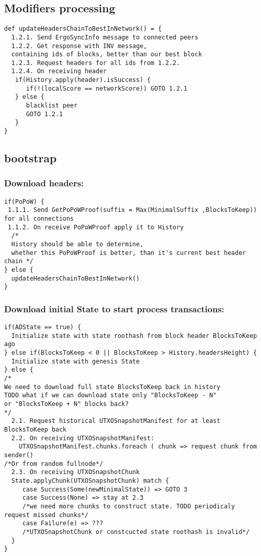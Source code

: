 \documentclass[]{report}   %
\begin{document}
\subsection{Modifiers processing}
\begin{verbatim}
def updateHeadersChainToBestInNetwork() = {
  1.2.1. Send ErgoSyncInfo message to connected peers
  1.2.2. Get response with INV message,
  containing ids of blocks, better than our best block
  1.2.3. Request headers for all ids from 1.2.2.
  1.2.4. On receiving header
   if(History.apply(header).isSuccess) {
      if(!(localScore == networkScore)) GOTO 1.2.1
   } else {
      blacklist peer
      GOTO 1.2.1
   }
}
\end{verbatim}

\subsection{bootstrap}
\subsubsection{Download headers:}
\begin{verbatim}
if(PoPoW) {
 1.1.1. Send GetPoPoWProof(suffix = Max(MinimalSuffix ,BlocksToKeep)) for all connections
 1.1.2. On receive PoPoWProof apply it to History
  /* 
  History should be able to determine, 
  whether this PoPoWProof is better, than it's current best header chain */
} else {
  updateHeadersChainToBestInNetwork()
}
\end{verbatim}
\subsubsection{Download initial State to start process transactions:}
\begin{verbatim}
if(ADState == true) {
  Initialize state with state roothash from block header BlocksToKeep ago
} else if(BlocksToKeep < 0 || BlocksToKeep > History.headersHeight) {
  Initialize state with genesis State
} else {
/*
We need to download full state BlocksToKeep back in history
TODO what if we can download state only "BlocksToKeep - N" 
or "BlocksToKeep + N" blocks back? 
*/
  2.1. Request historical UTXOSnapshotManifest for at least BlocksToKeep back
  2.2. On receiving UTXOSnapshotManifest: 
    UTXOSnapshotManifest.chunks.foreach ( chunk => request chunk from sender()
/*Or from random fullnode*/
  2.3. On receiving UTXOSnapshotChunk
  State.applyChunk(UTXOSnapshotChunk) match {
     case Success(Some(newMinimalState)) => GOTO 3
     case Success(None) => stay at 2.3
     /*we need more chunks to construct state. TODO periodicaly request missed chunks*/
     case Failure(e) => ??? 
     /*UTXOSnapshotChunk or constcucted state roothash is invalid*/  
  }
}
\end{verbatim}
\end{document}
